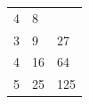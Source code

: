 {\begin{tabular}[t]{|l|l|l|}
        4 &
        8%
     \tabularnewline\cline{1-1}\cline{2-2}\cline{3-3}
        3 &
        9 &
        27%
     \tabularnewline\cline{1-1}\cline{2-2}\cline{3-3}
        4 &
        16 &
        64%
     \tabularnewline\cline{1-1}\cline{2-2}\cline{3-3}
        5 &
        25 &
        125%
     \tabularnewline\cline{1-1}\cline{2-2}\cline{3-3}

\end{tabular}}
